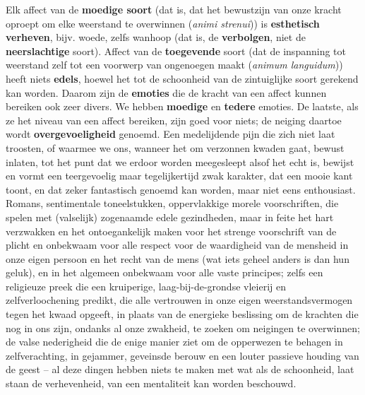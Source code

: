 Elk affect van de \textbf{moedige soort} (dat is, dat het bewustzijn van onze kracht oproept om elke weerstand te overwinnen (\textit{animi strenui})) is \textbf{esthetisch verheven}, bijv. woede, zelfs wanhoop (dat is, de \textbf{verbolgen}, niet de \textbf{neerslachtige} soort). Affect van de \textbf{toegevende} soort (dat de inspanning tot weerstand zelf tot een voorwerp van ongenoegen maakt (\textit{animum languidum})) heeft niets \textbf{edels}, hoewel het tot de schoonheid van de zintuiglijke soort gerekend kan worden. Daarom zijn de \textbf{emoties} die de kracht van een affect kunnen bereiken ook zeer divers. We hebben \textbf{moedige} en \textbf{tedere} emoties. De laatste, als ze het niveau van een affect bereiken, zijn goed voor niets; de neiging daartoe wordt \textbf{overgevoeligheid} genoemd. Een medelijdende pijn die zich niet laat troosten, of waarmee we ons, wanneer het om verzonnen kwaden gaat, bewust inlaten, tot het punt dat we erdoor worden meegesleept alsof het echt is, bewijst en vormt een teergevoelig maar tegelijkertijd zwak karakter, dat een mooie kant toont, en dat zeker fantastisch genoemd kan worden, maar niet eens enthousiast. Romans, sentimentale toneelstukken, oppervlakkige morele voorschriften, die spelen met (valselijk) zogenaamde edele gezindheden, maar in feite het hart verzwakken en het ontoegankelijk maken voor het strenge voorschrift van de plicht en onbekwaam voor alle respect voor de waardigheid van de mensheid in onze eigen persoon en het recht van de mens (wat iets geheel anders is dan hun geluk), en in het algemeen onbekwaam voor alle vaste principes; zelfs een religieuze preek die een kruiperige, laag-bij-de-grondse vleierij en zelfverloochening predikt, die alle vertrouwen in onze eigen weerstandsvermogen tegen het kwaad opgeeft, in plaats van de energieke beslissing om de krachten die nog in ons zijn, ondanks al onze zwakheid, te zoeken om neigingen te overwinnen; de valse nederigheid die de enige manier ziet om de opperwezen te behagen in zelfverachting, in gejammer, geveinsde berouw en een louter passieve houding van de geest – al deze dingen hebben niets te maken met wat als de schoonheid, laat staan de verhevenheid, van een mentaliteit kan worden beschouwd.

